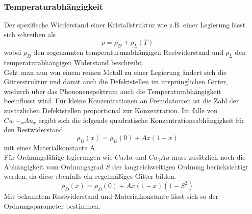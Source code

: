         \subsubsection{Temperaturabhängigkeit}
            Der spezifische Wiederstand einer Kristallstruktur wie z.B. einer Legierung lässt sich schreiben als
            \begin{equation}
                \rho = \rho_D + \rho_L(T)
            \end{equation}
            wobei $\rho_D$ den sogenannten temperaturunabhängigen Restwiderstand und $\rho_L$ den temperaturabhängigen
            Widerstand beschreibt.\\
            Geht man nun von einem reinen Metall zu einer Legierung ändert sich die Gitterstruktur und 
            damit auch die Defektstellen im ursprünglichen Gitter, wodurch über das Phononenspektrum auch
            die Temperaturabhängigkeit beeinflusst wird. Für kleine Konzentrationen an Fremdatomen ist die
            Zahl der zusätzlichen Defektstellen proportional zur Konzentration. Im falle von $Cu_1-_xAu_x$ ergibt sich
            die folgende quadratische Konzentrationsabhängigkeit für den Restwiderstand
            \begin{equation}
                \rho_D(x) = \rho_D(0)+Ax(1-x)
            \end{equation}  
            mit einer Materialkonstante A.\\
            Für Ordnungsfähige legierungen wie $CuAu$ und $Cu_3Au$ muss zusätzlich noch die Abhängigkeit vom
            Ordnungsgrad $S$ der langreichweitigen Ordnung berücksichtigt werden, da diese ebenfalls ein regelmäßiges
            Gitter bilden.
            \begin{equation}
                \rho_D(x) = \rho_D(0)+Ax(1-x)(1-S^2)
            \end{equation}
            Mit bekanntem Restwiderstand und Materialkonstante lässt sich so der Ordnungsparameter bestimmen.
        
